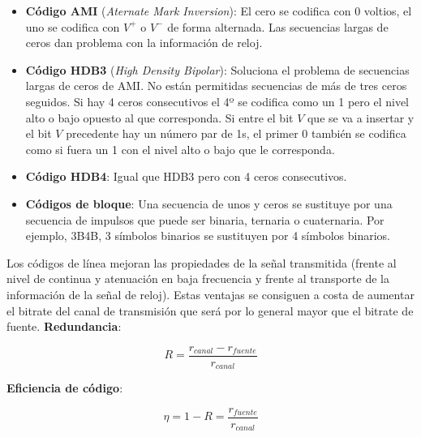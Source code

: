 \documentclass[10pt,portrait, twocolumn]{article}
\makeatletter
\renewcommand{\subsubsection}{\@startsection{subsubsection}{3}{0mm}%
                                {-1ex plus -.5ex minus -.2ex}%
                                {1ex plus .2ex}%
                                {\normalfont\small\bfseries}}
\makeatother
\begin{document}
	\begin{itemize}
		\item \textbf{Código AMI} (\textit{Aternate Mark Inversion}): El cero se codifica con 0 voltios, el uno se codifica con $V^{+}$ o $V^{-}$ de forma alternada. Las secuencias largas de ceros dan problema con la información de reloj.
		\item \textbf{Código HDB3} (\textit{High Density Bipolar}): Soluciona el problema de secuencias largas de ceros de AMI. No están permitidas secuencias de más de tres ceros seguidos. Si hay 4 ceros consecutivos el 4º se codifica como un 1 pero el nivel alto o bajo opuesto al que corresponda. Si entre el bit $V$ que se va a insertar y el bit $V$ precedente hay un número par de 1s, el primer 0 también se codifica como si fuera un 1 con el nivel alto o bajo que le corresponda.
		\item \textbf{Código HDB4}: Igual que HDB3 pero con 4 ceros consecutivos.
		\item \textbf{Códigos de bloque}: Una secuencia de unos y ceros se sustituye por una secuencia de impulsos que puede ser binaria, ternaria o cuaternaria. Por ejemplo, 3B4B, 3 símbolos binarios se sustituyen por 4 símbolos binarios.
	\end{itemize}
	

Los códigos de línea mejoran las propiedades de la señal transmitida (frente al nivel de continua y atenuación en baja frecuencia y frente al transporte de la información de la señal de reloj). Estas ventajas se consiguen a costa de aumentar el bitrate del canal de transmisión que será por lo general mayor que el bitrate de fuente. \textbf{Redundancia}:

	\begin{equation*}
		R = \frac{r_{canal} - r_{fuente}}{r_{canal}}
	\end{equation*}
	
\textbf{Eficiencia de código}:

	\begin{equation*}
		\eta = 1 - R = \frac{r_{fuente}}{r_{canal}}
	\end{equation*}
	
\end{document}
